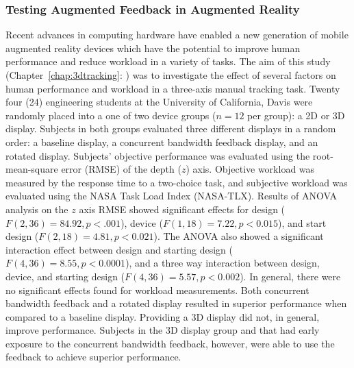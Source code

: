\subsubsection{Testing Augmented Feedback in Augmented Reality}
Recent advances in computing hardware have enabled a new generation of mobile augmented reality devices which have the potential to improve human performance and reduce workload in a variety of tasks.
The aim of this study (Chapter~\ref{chap:3dtracking}: ) was to investigate the effect of several factors on human performance and workload in a three-axis manual tracking task.
Twenty four (24) engineering students at the University of California, Davis were randomly placed into a one of two device groups ($n=12$ per group): a 2D or 3D display.
Subjects in both groups evaluated three different displays in a random order: a baseline display, a concurrent bandwidth feedback display, and an rotated display.
Subjects' objective performance was evaluated using the root-mean-square error (RMSE) of the depth ($z$) axis.
Objective workload was measured by the response time to a two-choice task, and subjective workload was evaluated using the NASA Task Load Index (NASA-TLX).
Results of ANOVA analysis on the $z$ axis RMSE showed significant effects for design ($F(2, 36)=84.92, p<.001$), device ($F(1, 18)=7.22, p<0.015$), and start design ($F(2, 18)=4.81, p<0.021$).
The ANOVA also showed a significant interaction effect between design and starting design ($F(4, 36)=8.55, p<0.0001$), and a three way interaction between design, device, and starting design ($F(4, 36)=5.57, p<0.002$).
In general, there were no significant effects found for workload measurements.
Both concurrent bandwidth feedback and a rotated display resulted in superior performance when compared to a baseline display.
Providing a 3D display did not, in general, improve performance.
Subjects in the 3D display group and that had early exposure to the concurrent bandwidth feedback, however, were able to use the feedback to achieve superior performance.

